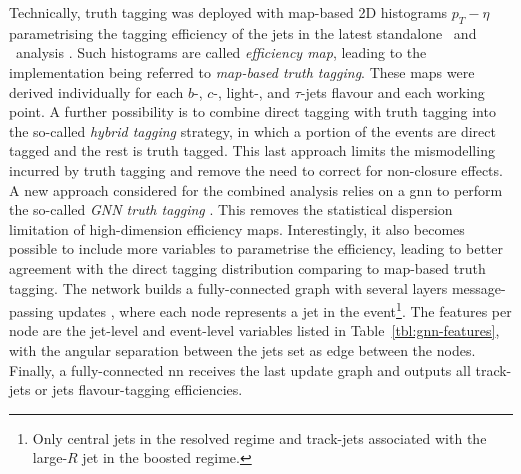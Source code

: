 Technically, truth tagging was deployed with map-based 2D histograms $p_T - \eta$ parametrising the tagging efficiency of the jets in the latest standalone \vhb\ and \vhc\ analysis \cite{ATLAS:2020fcp, Collaboration:2721696}. Such histograms are called \textit{efficiency map}, leading to the implementation being referred to \textit{map-based truth tagging}. These maps were derived individually for each $b$-, $c$-, light-, and $\tau$-jets flavour and each working point. A further possibility is to combine direct tagging with truth tagging into the so-called \textit{hybrid tagging} strategy, in which a portion of the events are direct tagged and the rest is truth tagged. This last approach limits the mismodelling incurred by truth tagging and remove the need to correct for non-closure effects. \\

A new approach considered for the combined analysis relies on a \gls{gnn} to perform the so-called \textit{GNN truth tagging} \cite{ATL-PHYS-PUB-2022-041}. This removes the statistical dispersion limitation of high-dimension efficiency maps. Interestingly, it also becomes possible to include more variables to parametrise the efficiency, leading to better agreement with the direct tagging distribution comparing to map-based truth tagging. The network builds a fully-connected graph with several layers message-passing updates \cite{graphInductiveBias}, where each node represents a jet in the event\footnote{Only central jets in the resolved regime and track-jets associated with the large-$R$ jet in the boosted regime.}. The features per node are the jet-level and event-level variables listed in Table~\ref{tbl:gnn-features}, with the angular separation between the jets set as edge between the nodes. Finally, a fully-connected \gls{nn} receives the last update graph and outputs all track-jets or jets flavour-tagging efficiencies.

